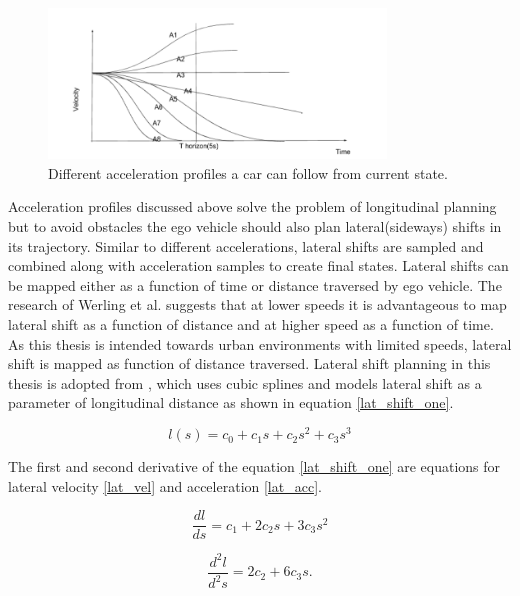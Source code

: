  \begin{figure}[H]
    \centering
    \includegraphics[width=0.8\textwidth]{Images/velcoities.png}
    \caption{Different acceleration profiles a car can follow from current state.}
    \label{velocities}
\end{figure}


Acceleration profiles discussed above solve the problem of longitudinal planning but to avoid obstacles the ego vehicle should also plan lateral(sideways) shifts in its trajectory. Similar to different accelerations, lateral shifts are sampled and combined along with acceleration samples to create final states. Lateral shifts can be mapped either as a function of time or distance traversed by ego vehicle. The research of Werling et al. \cite{werling_frenet} suggests that at lower speeds it is advantageous to map lateral shift as a function of distance and at higher speed as a function of time. As this thesis is intended towards urban environments with limited speeds, lateral shift is mapped as function of distance traversed. Lateral shift planning in this thesis is adopted from \cite{real_time_traj_plan_article}, which uses cubic splines and models lateral shift as a parameter of longitudinal distance as shown in equation \ref{lat_shift_one}. 

\begin{equation}
l(s) = c_0 + c_1s + c_2s^2 + c_3s^3
\label{lat_shift_one}
\end{equation}

The first and second derivative of the equation \ref{lat_shift_one} are equations for lateral velocity \ref{lat_vel} and acceleration \ref{lat_acc}.

\begin{equation}
    \frac{dl}{ds} = c_1 + 2c_2s + 3c_3s^2
\label{lat_vel}
\end{equation}


\begin{equation}
    \frac{d^2l}{d^2s} = 2c_2 + 6c_3s.
\label{lat_acc}    
\end{equation}

